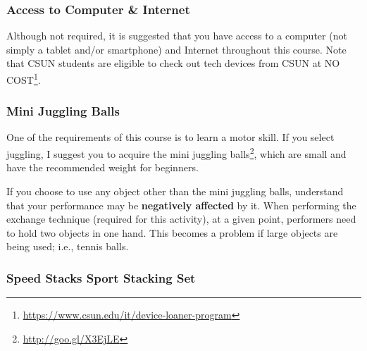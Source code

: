 \documentclass[
  letterpaper,
  DIV=11,
  numbers=noendperiod]{scrartcl}
\DeclareRobustCommand{\href}[2]{#2\footnote{\url{#1}}}
\begin{document}
\hypertarget{access-to-computer-internet}{%
\subsubsection{Access to Computer \&
Internet}\label{access-to-computer-internet}}

Although not required, it is suggested that you have access to a
computer (not simply a tablet and/or smartphone) and Internet throughout
this course. Note that CSUN students are eligible to
\href{https://www.csun.edu/it/device-loaner-program}{check out tech
devices from CSUN at NO COST}.

\hypertarget{mini-juggling-balls}{%
\subsubsection{Mini Juggling Balls}\label{mini-juggling-balls}}

One of the requirements of this course is to learn a motor skill. If you
select juggling, I suggest you to acquire the
\href{http://goo.gl/X3EjLE}{mini juggling balls}, which are small and
have the recommended weight for beginners.

\begin{tcolorbox}[enhanced jigsaw, leftrule=.75mm, breakable, opacityback=0, bottomrule=.15mm, rightrule=.15mm, colbacktitle=quarto-callout-important-color!10!white, colframe=quarto-callout-important-color-frame, arc=.35mm, bottomtitle=1mm, left=2mm, title=\textcolor{quarto-callout-important-color}{\faExclamation}\hspace{0.5em}{Important}, titlerule=0mm, toptitle=1mm, toprule=.15mm, opacitybacktitle=0.6, colback=white, coltitle=black]

If you choose to use any object other than the mini juggling balls,
understand that your performance may be \textbf{negatively affected} by
it. When performing the exchange technique (required for this activity),
at a given point, performers need to hold two objects in one hand. This
becomes a problem if large objects are being used; i.e., tennis balls.

\end{tcolorbox}

\hypertarget{speed-stacks-sport-stacking-set}{%
\subsubsection{Speed Stacks Sport Stacking
Set}\label{speed-stacks-sport-stacking-set}}
\end{document}
